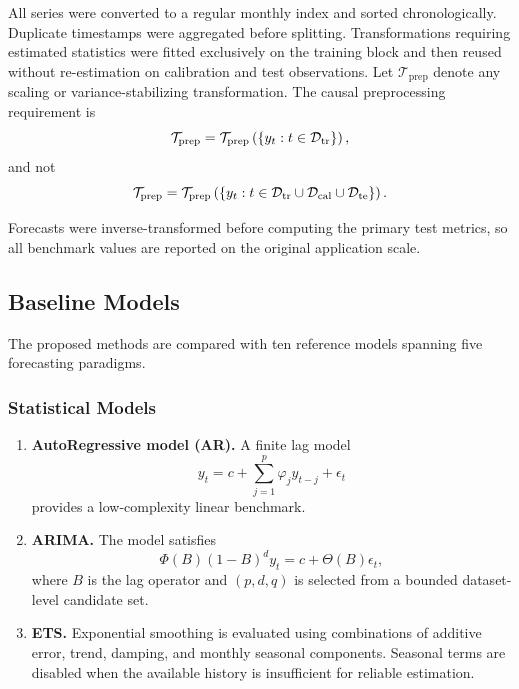 \documentclass[review,number,sort&compress]{elsarticle}
\begin{document}
All series were converted to a regular monthly index and sorted
chronologically. Duplicate timestamps were aggregated before splitting.
Transformations requiring estimated statistics were fitted exclusively on the
training block and then reused without re-estimation on calibration and test
observations.
Let $\mathcal{T}_{\mathrm{prep}}$ denote any scaling or variance-stabilizing
transformation. The causal preprocessing requirement is
\begin{equation}
    \mathcal{T}_{\mathrm{prep}}
    =
    \mathcal{T}_{\mathrm{prep}}
    \left(
    \{y_t:t\in\mathcal{D}_{\mathrm{tr}}\}
    \right),
\end{equation}
and not
\begin{equation}
    \mathcal{T}_{\mathrm{prep}}
    =
    \mathcal{T}_{\mathrm{prep}}
    \left(
    \{y_t:t\in\mathcal{D}_{\mathrm{tr}}\cup\mathcal{D}_{\mathrm{cal}}\cup\mathcal{D}_{\mathrm{te}}\}
    \right).
\end{equation}

Forecasts were inverse-transformed before computing the primary test metrics,
so all benchmark values are reported on the original application scale.

\subsection{Baseline Models}
\label{subsec:baselines}

The proposed methods are compared with ten reference models spanning five
forecasting paradigms.

\subsubsection{Statistical Models}

\begin{enumerate}
    \item \textbf{AutoRegressive model (AR).}
    A finite lag model
    \begin{equation}
        y_t
        =
        c
        +
        \sum_{j=1}^{p}\varphi_jy_{t-j}
        +
        \epsilon_t
    \end{equation}
    provides a low-complexity linear benchmark.

    \item \textbf{ARIMA.}
    The model satisfies
    \begin{equation}
        \Phi(B)(1-B)^dy_t
        =
        c+\Theta(B)\epsilon_t,
    \end{equation}
    where $B$ is the lag operator and $(p,d,q)$ is selected from a bounded
    dataset-level candidate set.

    \item \textbf{ETS.}
    Exponential smoothing is evaluated using combinations of additive error,
    trend, damping, and monthly seasonal components. Seasonal terms are
    disabled when the available history is insufficient for reliable
    estimation.
\end{enumerate}
\end{document}
